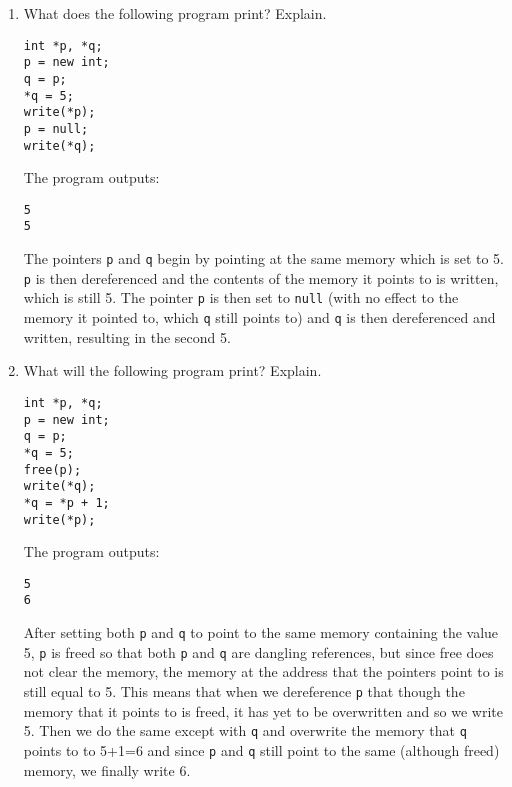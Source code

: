 \documentclass[11pt]{exam}
\begin{document}
\begin{questions}
        \begin{enumerate}[label=(\roman*)]
            \item What does the following program print? Explain.
                \begin{lstlisting}
int *p, *q;
p = new int;
q = p;
*q = 5;
write(*p);
p = null;
write(*q);
                \end{lstlisting}

                \begin{framed}
                    The program outputs:
                    \begin{lstlisting}
5
5
                    \end{lstlisting}
                    The pointers {\tt p} and {\tt q} begin by pointing at the same memory which is set to 5. {\tt p} is then dereferenced and the contents of the memory it points to is written, which is still 5. The pointer {\tt p} is then set to {\tt null} (with no effect to the memory it pointed to, which {\tt q} still points to) and {\tt q} is then dereferenced and written, resulting in the second 5.
                \end{framed}

            \item What will the following program print? Explain.
                \begin{lstlisting}
int *p, *q;
p = new int;
q = p;
*q = 5;
free(p);
write(*q);
*q = *p + 1;
write(*p);
                \end{lstlisting}

                \begin{framed}
                    The program outputs:
                    \begin{lstlisting}
5
6
                    \end{lstlisting}
                    After setting both {\tt p} and {\tt q} to point to the same memory containing the value 5, {\tt p} is freed so that both {\tt p} and {\tt q} are dangling references, but since free does not clear the memory, the memory at the address that the pointers point to is still equal to 5. This means that when we dereference {\tt p} that though the memory that it points to is freed, it has yet to be overwritten and so we write 5. Then we do the same except with {\tt q} and overwrite the memory that {\tt q} points to to 5+1=6 and since {\tt p} and {\tt q} still point to the same (although freed) memory, we finally write 6.

                \end{framed}


\end{enumerate}
\end{questions}
\end{document}
